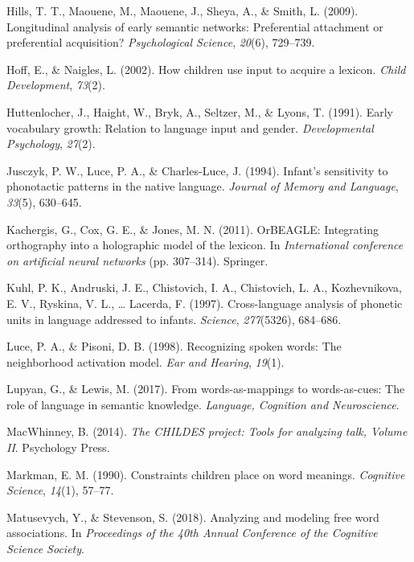 \documentclass[english,floatsintext,man]{apa6}
\theoremstyle{definition}
\theoremstyle{definition}
\theoremstyle{definition}
\theoremstyle{remark}
\begin{document}
\hypertarget{ref-hills2009}{}
Hills, T. T., Maouene, M., Maouene, J., Sheya, A., \& Smith, L. (2009).
Longitudinal analysis of early semantic networks: Preferential
attachment or preferential acquisition? \emph{Psychological Science},
\emph{20}(6), 729--739.

\hypertarget{ref-hoff2002}{}
Hoff, E., \& Naigles, L. (2002). How children use input to acquire a
lexicon. \emph{Child Development}, \emph{73}(2).

\hypertarget{ref-huttenlocher1991}{}
Huttenlocher, J., Haight, W., Bryk, A., Seltzer, M., \& Lyons, T.
(1991). Early vocabulary growth: Relation to language input and gender.
\emph{Developmental Psychology}, \emph{27}(2).

\hypertarget{ref-jusczyk1994}{}
Jusczyk, P. W., Luce, P. A., \& Charles-Luce, J. (1994). Infant's
sensitivity to phonotactic patterns in the native language.
\emph{Journal of Memory and Language}, \emph{33}(5), 630--645.

\hypertarget{ref-kachergis2011}{}
Kachergis, G., Cox, G. E., \& Jones, M. N. (2011). OrBEAGLE: Integrating
orthography into a holographic model of the lexicon. In
\emph{International conference on artificial neural networks} (pp.
307--314). Springer.

\hypertarget{ref-kuhl1997}{}
Kuhl, P. K., Andruski, J. E., Chistovich, I. A., Chistovich, L. A.,
Kozhevnikova, E. V., Ryskina, V. L., \ldots{} Lacerda, F. (1997).
Cross-language analysis of phonetic units in language addressed to
infants. \emph{Science}, \emph{277}(5326), 684--686.

\hypertarget{ref-luce1998}{}
Luce, P. A., \& Pisoni, D. B. (1998). Recognizing spoken words: The
neighborhood activation model. \emph{Ear and Hearing}, \emph{19}(1).

\hypertarget{ref-lupyan2017}{}
Lupyan, G., \& Lewis, M. (2017). From words-as-mappings to
words-as-cues: The role of language in semantic knowledge.
\emph{Language, Cognition and Neuroscience}.

\hypertarget{ref-macwhinney2014}{}
MacWhinney, B. (2014). \emph{The CHILDES project: Tools for analyzing
talk, Volume II}. Psychology Press.

\hypertarget{ref-markman90}{}
Markman, E. M. (1990). Constraints children place on word meanings.
\emph{Cognitive Science}, \emph{14}(1), 57--77.

\hypertarget{ref-matusevych2018}{}
Matusevych, Y., \& Stevenson, S. (2018). Analyzing and modeling free
word associations. In \emph{Proceedings of the 40th Annual Conference of
the Cognitive Science Society}.
\end{document}
